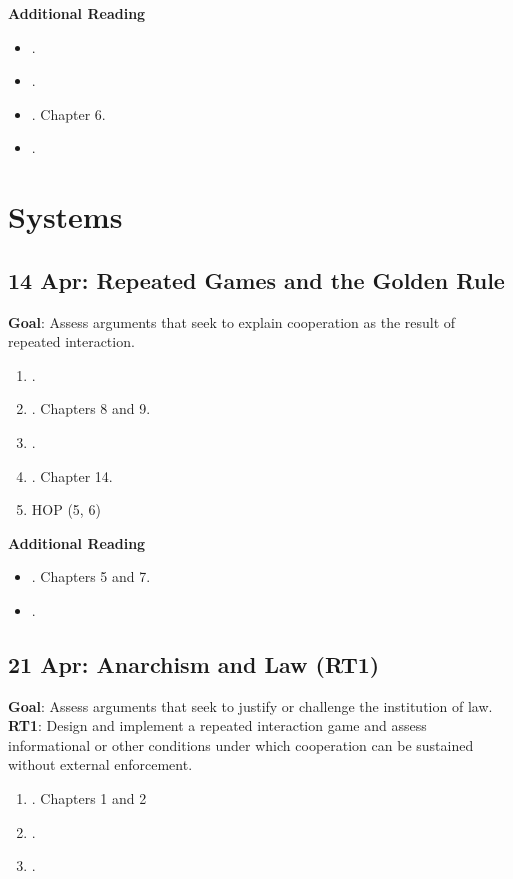 \documentclass[11pt]{article}
\begin{document}
\textbf{Additional Reading}
\begin{itemize}
\item {}.
\item {}.
\item {}. Chapter 6.
\item {}.
\end{itemize}



\section{Systems}
\subsection{14 Apr: Repeated Games and the Golden Rule}
\textbf{Goal}: Assess arguments that seek to explain cooperation as the result of repeated interaction.
\begin{enumerate}
\item {}.
\item {}. Chapters 8 and 9.
\item {}.
\item {}. Chapter 14.

\item HOP (5, 6)
\end{enumerate}

\textbf{Additional Reading}
\begin{itemize}
\item {}. Chapters 5 and 7.
\item {}.
\end{itemize}


\subsection{21 Apr: Anarchism and Law (RT1)}
\textbf{Goal}: Assess arguments that seek to justify or challenge the institution of law. \textbf{RT1}: Design and implement a repeated interaction game and assess informational or other conditions under which cooperation can be sustained without external enforcement. 
\begin{enumerate}
\item {}. {Chapters 1 and 2}
\item {}.
\item {}.
\end{enumerate}
\end{document}
